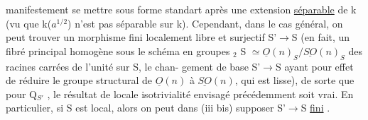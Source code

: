 
manifestement se mettre sous forme standart après une extension \uline{séparable}
de k (vu que k($a^{1/2}$) n'est pas séparable sur k). Cependant, dans le cas
 général, on peut trouver un morphisme fini  localement
libre et surjectif S'$\to$S (en fait, un fibré principal homogène sous
le schéma en groupes \hand{$\mu$}$_{2}$ S $\simeq \underline{O}(n)_S/\underline{SO}(n)_S$ \hand{(}des racines carrées\hand{)} de l'unité sur S,\hand{--} le chan-%
gement de base S'$\to$S ayant pour effet de réduire le groupe structural de
$\underline{O}(n)$ à $\underline{SO}(n)$, qui est lisse), de sorte que pour Q$_{S'}$ , le résultat de
locale isotrivialité envisagé précédemment soit vrai. En particulier, si
S est local, alors on peut dans (iii bis) supposer S'$\to$S \uline{fini} .

